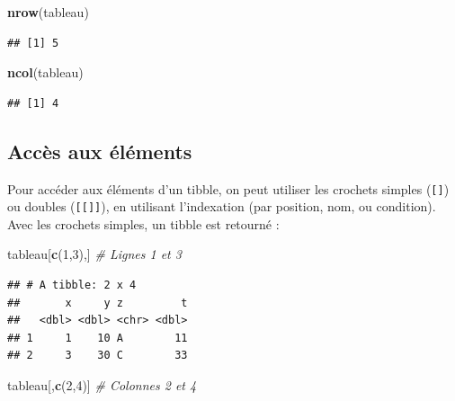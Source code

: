 \documentclass[
  11pt,
]{book}
\newenvironment{Shaded}{\begin{snugshade}}{\end{snugshade}}
\newcommand{\CommentTok}[1]{\textcolor[rgb]{0.56,0.35,0.01}{\textit{#1}}}
\newcommand{\DecValTok}[1]{\textcolor[rgb]{0.00,0.00,0.81}{#1}}
\newcommand{\FunctionTok}[1]{\textcolor[rgb]{0.13,0.29,0.53}{\textbf{#1}}}
\newcommand{\NormalTok}[1]{#1}
\numberwithin{equation}{section}
\numberwithin{countremarque}{section}
\begin{document}
\begin{Shaded}
\begin{Highlighting}[]
\FunctionTok{nrow}\NormalTok{(tableau)}
\end{Highlighting}
\end{Shaded}

\begin{lstlisting}
## [1] 5
\end{lstlisting}

\begin{Shaded}
\begin{Highlighting}[]
\FunctionTok{ncol}\NormalTok{(tableau)}
\end{Highlighting}
\end{Shaded}

\begin{lstlisting}
## [1] 4
\end{lstlisting}

\hypertarget{accuxe8s-aux-uxe9luxe9ments-1}{%
\subsection{Accès aux éléments}\label{accuxe8s-aux-uxe9luxe9ments-1}}

Pour accéder aux éléments d'un tibble, on peut utiliser les crochets simples (\texttt{{[}{]}}) ou doubles (\texttt{{[}{[}{]}{]}}), en utilisant l'indexation (par position, nom, ou condition). Avec les crochets simples, un tibble est retourné :

\begin{Shaded}
\begin{Highlighting}[]
\NormalTok{tableau[}\FunctionTok{c}\NormalTok{(}\DecValTok{1}\NormalTok{,}\DecValTok{3}\NormalTok{),] }\CommentTok{\# Lignes 1 et 3}
\end{Highlighting}
\end{Shaded}

\begin{lstlisting}
## # A tibble: 2 x 4
##       x     y z         t
##   <dbl> <dbl> <chr> <dbl>
## 1     1    10 A        11
## 2     3    30 C        33
\end{lstlisting}

\begin{Shaded}
\begin{Highlighting}[]
\NormalTok{tableau[,}\FunctionTok{c}\NormalTok{(}\DecValTok{2}\NormalTok{,}\DecValTok{4}\NormalTok{)] }\CommentTok{\# Colonnes 2 et 4}
\end{Highlighting}
\end{Shaded}
\end{document}
